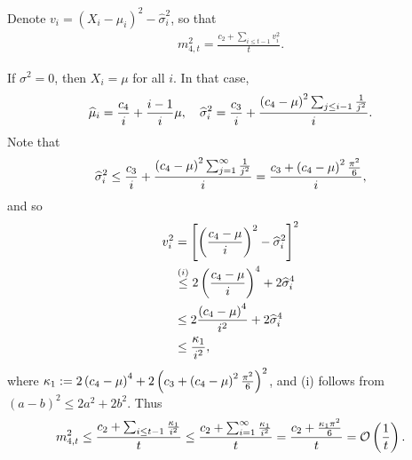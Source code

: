  Denote $v_i = (X_i - \widehat\mu_i)^2 - \widehat\sigma_i^2 $, so that
    \begin{align*}
        m_{4, t}^2 = \frac{c_2 + \sum_{i \leq t-1} v_i^2}{t}.
    \end{align*}
    
    If $\sigma^2 =  0$, then $X_i = \mu$ for all $i$. In that case, 
    \begin{align*}
        \widehat\mu_i = \frac{c_4}{i} + \frac{i-1}{i} \mu, \quad \widehat\sigma_i^2 = \frac{c_3}{i} + \frac{\left( c_4 - \mu \right)^2 \sum_{j\leq i-1}  \frac{1}{j^2}}{i}.
    \end{align*}
    Note that 
    \begin{align*}
        \widehat\sigma_i^2 \leq \frac{c_3}{i} + \frac{\left( c_4 - \mu \right)^2 \sum_{j= 1}^\infty   \frac{1}{j^2}}{i} = \frac{c_3 + \left( c_4 - \mu \right)^2 \frac{\pi^2}{6}}{i},
    \end{align*}
    and so
    \begin{align*}
        v_i^2 &= \left[ \left( \frac{c_4 - \mu}{i}\right)^2 - \widehat\sigma_i^2 \right]^2
        \\&\stackrel{(i)}{\leq} 2\left( \frac{c_4 - \mu}{i}\right)^4 + 2 \widehat\sigma_i^4
        \\&\stackrel{}{\leq} 2 \frac{\left( c_4 - \mu \right)^4 }{i^2} + 2 \widehat\sigma_i^4
        \\&\stackrel{}{\leq} \frac{\kappa_1}{i^2},
    \end{align*}
    where $\kappa_1 := 2\left( c_4 - \mu \right)^4 + 2 \left( c_3 + \left( c_4 - \mu \right)^2 \frac{\pi^2}{6} \right)^2$, and (i) follows from $(a - b)^2 \leq 2a^2 + 2b^2$. Thus
    \begin{align*}
         m_{4, t}^2 \leq \frac{c_2 + \sum_{i \leq t-1} \frac{\kappa_1}{i^2}}{t} \leq \frac{c_2 + \sum_{i=1}^\infty \frac{\kappa_1}{i^2}}{t} = \frac{c_2 + \frac{\kappa_1 \pi^2}{6}}{t} = \mathcal{O} \left( \frac{1}{t}\right).
    \end{align*} 

